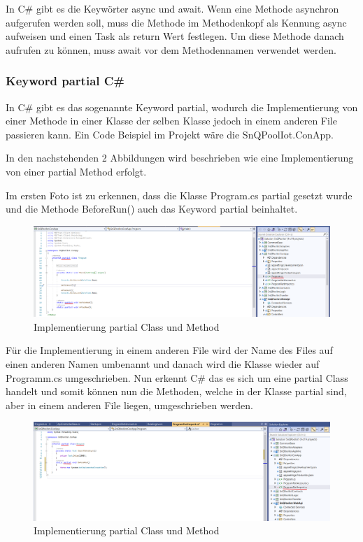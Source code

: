 In C\# gibt es die Keywörter async und await. Wenn eine Methode asynchron aufgerufen werden soll, muss die Methode im Methodenkopf als Kennung async aufweisen und einen Task als return Wert festlegen.
Um diese Methode danach aufrufen zu können, muss await vor dem Methodennamen verwendet werden.


\subsubsection*{Keyword partial C\#}
In C\# gibt es das sogenannte Keyword partial, wodurch die Implementierung von einer Methode in einer Klasse der selben Klasse jedoch in einem anderen File passieren kann.
Ein Code Beispiel im Projekt wäre die SnQPoolIot.ConApp.

In den nachstehenden 2 Abbildungen wird beschrieben wie eine Implementierung von einer partial Method erfolgt.

Im ersten Foto ist zu erkennen, dass die Klasse Program.cs partial gesetzt wurde und die Methode BeforeRun() auch das Keyword partial beinhaltet.
\begin{figure}[H]
    \centering
    \includegraphics[width=1\textwidth]{./pics/PartialKeyword1.png}
    \caption{Implementierung partial Class und Method}
\end{figure}

Für die Implementierung in einem anderen File wird der Name des Files auf einen anderen Namen umbenannt und danach wird die Klasse wieder auf Programm.cs umgeschrieben.
Nun erkennt C\# das es sich um eine partial Class handelt und somit können nun die Methoden, welche in der Klasse partial sind, aber in einem anderen File liegen, umgeschrieben werden. 
\begin{figure}[H]
    \centering
    \includegraphics[width=1\textwidth]{./pics/PartialKeyword2.png}
    \caption{Implementierung partial Class und Method}
\end{figure}


